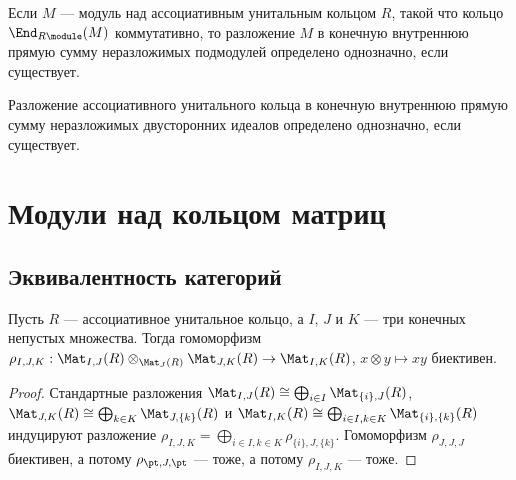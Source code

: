 \documentclass[
	extrafontsizes,
	11pt,
	hyphens,
]{memoir}
\begin{document}
\begin{corollary}
Если \(M\) --- модуль над ассоциативным унитальным кольцом \(R\), такой что кольцо \(\End_{R\module}(M)\) коммутативно, то разложение \(M\) в конечную внутреннюю прямую сумму неразложимых подмодулей определено однозначно, если существует.
\end{corollary}

\begin{corollary}
Разложение%
ассоциативного унитального кольца в конечную внутреннюю прямую сумму неразложимых двусторонних идеалов определено однозначно, если существует.
\end{corollary}


\section{Модули над кольцом матриц}

\subsection{Эквивалентность категорий}

\begin{theorem}
Пусть \(R\) --- ассоциативное унитальное кольцо,
а \(I\), \(J\) и \(K\) --- три конечных непустых множества.%
\label{thm:MatrixTensorMorita}
Тогда гомоморфизм
\(
\rho_{I,J,K} :
\Mat_{I,J}(R)
\otimes_{\Mat_J(R)}
\Mat_{J,K}(R)
\to
\Mat_{I,K}(R)
\),
\(x \otimes y \mapsto xy\)
биективен.
\end{theorem}

\begin{proof}
Стандартные разложения
\(\Mat_{I,J}(R) \cong \bigoplus_{i \in I} \Mat_{\{i\},J}(R)\),
\(\Mat_{J,K}(R) \cong \bigoplus_{k \in K} \Mat_{J,\{k\}}(R)\)
и
\(\Mat_{I,K}(R) \cong \bigoplus_{i \in I, k \in K} \Mat_{\{i\},\{k\}}(R)\)
индуцируют разложение
\(\rho_{I,J,K} = \bigoplus_{i \in I, k \in K} \rho_{\{i\},J,\{k\}}\).
Гомоморфизм \(\rho_{J,J,J}\) биективен,
а потому \(\rho_{\pt,J,\pt}\) --- тоже,
а потому \(\rho_{I,J,K}\) --- тоже.
\end{proof}
\end{document}
